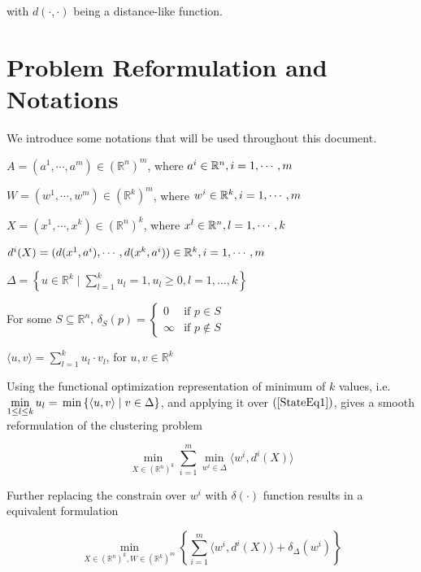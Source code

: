 \documentclass[11pt]{article}
\numberwithin{equation}{section}
\begin{document}
\noindent with $\textit{d}(\cdot ,\cdot)$ being a distance-like function.

\section{Problem Reformulation and Notations}

We introduce some notations that will be used throughout this document.

\noindent $A = (a^1, \cdots , a^m) \in \left(\mathbb{R}^n\right)^m$, where $a^i \in \mathbb{R}^n,\smallskip i=1, \cdots , m$

\noindent $W = (w^1, \cdots , w^m) \in \left(\mathbb{R}^k\right)^m$, where $w^i \in \mathbb{R}^k,\smallskip i=1, \cdots , m$

\noindent $X = (x^1, \cdots , x^k) \in \left(\mathbb{R}^n\right)^k$, where $x^l \in \mathbb{R}^n,\smallskip l=1, \cdots , k$

\noindent $d^{i}(X) = (d(x^1,a^i), \cdots , d(x^k,a^i)) \in \mathbb{R}^k,\smallskip i=1, \cdots , m$

\noindent $\Delta = \left\lbrace u \in \mathbb{R}^k \mid \sum\limits_{l=1}^{k} u_l = 1, u_l \geq 0 , l=1, \dots ,k \right\rbrace$

\noindent For some $S \subseteq \mathbb{R}^n$, $\delta_S(p) = \begin{cases} 0 &\mbox{if } p \in S \\ 
\infty &\mbox{if } p \not\in S \end{cases}$

\noindent $\langle u,v \rangle = \sum\limits_{l=1}^{k} u_l \cdot v_l$, for $u,v \in \mathbb{R}^k$

Using the functional optimization representation of minimum of $k$ values, i.e. $\min\limits_{1 \leq l \leq k} u_l = \newline \min \left\lbrace \langle u,v \rangle \mid v \in \Delta \right\rbrace$, and applying it over $\left(\ref{StateEq1}\right)$, gives a smooth reformulation of the clustering problem

\begin{equation}
	\min\limits_{X \in \left(\mathbb{R}^n\right)^k} \sum\limits_{i=1}^{m} \min\limits_{w^i \in \Delta} \langle w^i , d^i(X) \rangle \label{StateEq2}
\end{equation}

Further replacing the constrain over $w^i$ with $\delta(\cdot)$ function results in a equivalent formulation

\begin{equation}
	\min\limits_{X \in \left(\mathbb{R}^n\right)^k , W \in \left(\mathbb{R}^k\right)^m} \left\lbrace \sum\limits_{i=1}^{m} \langle w^i , d^i(X) \rangle + \delta_{\Delta}(w^i) \right\rbrace \label{StateEq3}
\end{equation}
\end{document}

